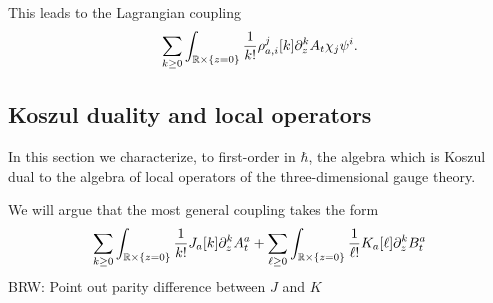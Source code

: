 \documentclass[11pt]{amsart}
\def\brian#1{{\textcolor{blue!65!red}{BRW: {#1}}}}
\def\natalie#1{{\textcolor{green!65!black}{NMP: {#1}}}}
\begin{document}
%
%
%
This leads to the Lagrangian coupling
\[
\sum_{k \geq 0} \int_{\mathbb R \times \{z=0\}} \frac{1}{k!} \rho_{a,i}^j[k] \partial_z^k A_t \chi_j \psi^i .
\]



\subsection*{Koszul duality and local operators}

In this section we characterize, to first-order in $\hbar$, the algebra which is Koszul dual to the algebra of local operators of the three-dimensional gauge theory.

We will argue that the most general coupling takes the form
\[
\sum_{k \geq 0} \int_{\mathbb R \times \{z=0\}} \frac{1}{k!} J_a [k] \partial_z^k A^a_t + \sum_{\ell \geq 0} \int_{\mathbb R \times \{z=0\}} \frac{1}{\ell!} K_a[\ell] \partial_z^k B_t^a 
\] 
\brian{Point out parity difference between $J$ and $K$}
\end{document}
